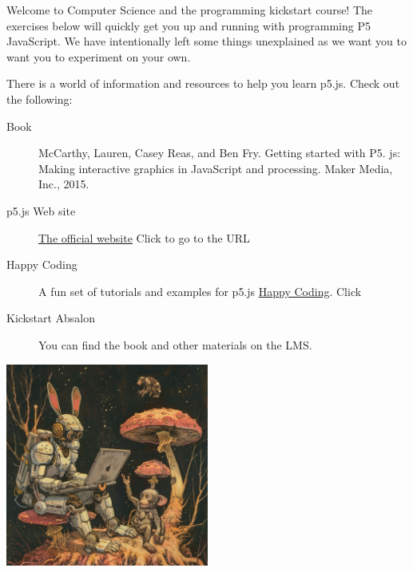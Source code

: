 \documentclass{ucph-handout}
\begin{document}
\begin{exercisebox}[adjusted title=Welcome to Kickstart]
Welcome to Computer Science and the programming kickstart course!
The exercises below will quickly get you up and running with programming P5 JavaScript. We have intentionally left some things unexplained as we want you to want you to experiment on your own.
\end{exercisebox}

\begin{exercisebox}[adjusted title=Resources]
There is a world of information and resources to help you learn p5.js. Check out the following:
\begin{description}
\item[ Book]  McCarthy, Lauren, Casey Reas, and Ben Fry. Getting started with P5. js: Making interactive graphics in JavaScript and processing. Maker Media, Inc., 2015.
\item[p5.js Web site] \href{https://p5js.org/}{The official website} Click to go to the URL
\item[Happy Coding] A fun set of tutorials and examples for p5.js \href{https://happycoding.io/}{Happy Coding}. Click
\item[Kickstart Absalon] You can find the book and other materials on the LMS.
\end{description}
\end{exercisebox}

\begin{exercisebox}[adjusted title=Have Fun]
\begin{center}
\includegraphics[width=0.5\textwidth]{illustrationer/monkey_fun.png}
\end{center}

\end{exercisebox}















\end{document}
